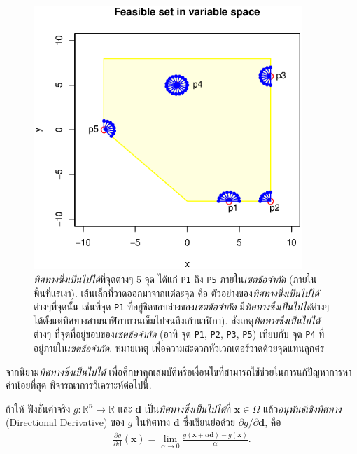 %
\begin{figure}
\begin{center}
\includegraphics[width=4.0in]
{02Background/feasibleDirections.eps}
\end{center}
\caption{\textit{ทิศทางซึ่งเป็นไปได้}ที่จุดต่างๆ 5 จุด 
ได้แก่ \texttt{P1} ถึง \texttt{P5} ภายใน\textit{เซตข้อจำกัด} (ภายในพื้นที่แรเงา). เส้นเล็กที่วาดออกมาจากแต่ละจุด คือ ตัวอย่างของ\textit{ทิศทางซึ่งเป็นไปได้}ต่างๆที่จุดนั้น 
เช่นที่จุด \texttt{P1} ที่อยู่ชิดขอบล่างของ\textit{เซตข้อจำกัด} มี\textit{ทิศทางซึ่งเป็นไปได้}ต่างๆ ได้ตั้งแต่ทิศทางสามนาฬิกาทวนเข็มไปจนถึงเก้านาฬิกา).
สังเกตุ\textit{ทิศทางซึ่งเป็นไปได้}ต่างๆ ที่จุดที่อยู่ขอบของ\textit{เซตข้อจำกัด} (อาทิ จุด \texttt{P1}, \texttt{P2}, \texttt{P3}, \texttt{P5}) เทียบกับ จุด \texttt{P4} ที่อยู่ภายใน\textit{เซตข้อจำกัด}. 
หมายเหตุ เพื่อความสะดวกหัวเวกเตอร์วาดด้วยจุดแทนลูกศร}
\label{fig: feasible directions at different points}
\end{figure}
%

จากนิยาม\textit{ทิศทางซึ่งเป็นไปได้} เพื่อศึกษาคุณสมบัติหรือเงื่อนไขที่สามารถใช้ช่วยในการแก้ปัญหาการหาค่าน้อยที่สุด
พิจารณาการวิเคราะห์ต่อไปนี้.

ถ้าให้ ฟังชั่นค่าจริง $g: \mathbb{R}^n \mapsto \mathbb{R}$ และ $\mathbf{d}$ เป็น\textit{ทิศทางซึ่งเป็นไปได้}ที่ $\mathbf{x} \in \Omega$ แล้ว\textit{อนุพันธ์เชิงทิศทาง} (Directional Derivative) ของ $g$ ในทิศทาง $\mathbf{d}$ ซึ่งเขียนย่อด้วย $\partial g/\partial \mathbf{d}$, คือ
\begin{eqnarray}
   \frac{\partial g}{\partial \mathbf{d}} (\mathbf{x}) = \lim_{\alpha \to 0} \frac{g(\mathbf{x} + \alpha \mathbf{d}) - g(\mathbf{x})}{\alpha}.
\end{eqnarray}

